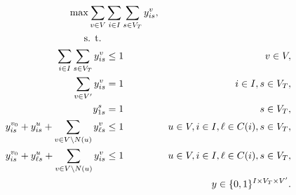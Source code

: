 \begin{subequations}\label{mod:genmatch}
\begin{align}
\notag \max\sum\limits_{v\in V}&\sum\limits_{i\in I}\sum\limits_{s\in V_T}   y_{is}^v,\\
\notag \text{s. t. } \\
\label{mod:genmatch:nodeBelongs} \sum\limits_{i\in I}\sum\limits_{s\in V_T}y^v_{is} & \leq 1 & v\in V,\\
\label{mod:genmatch:treeHasIJ} \sum\limits_{v\in V'}y^v_{is} & = 1 & i\in I,s\in V_T,\\
\label{mod:genmatch:source1} y_{1s}^s & = 1  & s\in V_T,\\
\label{mod:genmatch:followArcsA}y^{v_0}_{is}+y^u_{i s} + \sum\limits_{v\in V\setminus N(u)}y^v_{\ell s}&\leq 1 & u\in V,i\in I,\ell\in C(i), s\in V_T,  \\
\label{mod:genmatch:followArcsB}y^{v_0}_{is}+y^u_{\ell s} + \sum\limits_{v\in V\setminus N(u)}y^v_{i s}&\leq 1 & u\in V,i\in I,\ell\in C(i), s\in V_T,\\ 
\label{mod:genmatch:dim}&&y \in \{0,1\}^{I\times V_T\times V'}.
\end{align}~
\end{subequations}



